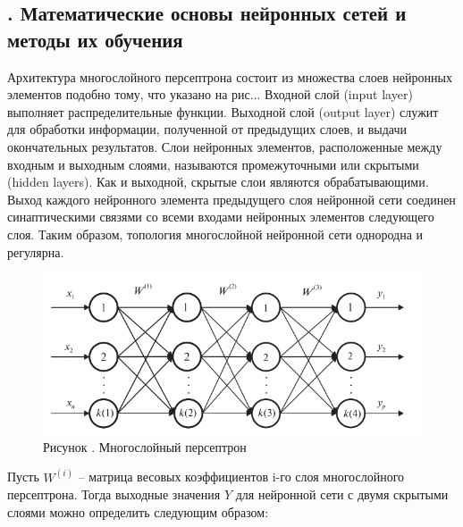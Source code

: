 \subtitlespace

\subsection*{
	\gostTitleFont
	\redline
	\thechaptercntr .\thesubchaptercntr \spc
	Математические основы нейронных сетей и методы их обучения
} \addtocounter{subchaptercntr}{1}

\subtitlespace

{\gostFont
	
	\par \redline Архитектура многослойного персептрона состоит из множества слоев нейронных элементов подобно тому, что указано на рис.\thechaptercntr .\theimagecntr. Входной слой (input layer) выполняет распределительные функции. Выходной слой (output layer) служит для обработки информации, полученной от предыдущих слоев, и выдачи окончательных результатов. Слои нейронных элементов, расположенные между входным и выходным слоями, называются промежуточными или скрытыми (hidden layers). Как и выходной, скрытые слои являются обрабатывающими. Выход каждого нейронного элемента предыдущего слоя нейронной
	сети соединен синаптическими связями со всеми входами нейронных элементов следующего слоя. Таким образом, топология многослойной нейронной сети однородна и регулярна.
	
	\begin{figure}[H]
		\centering
		\def\svgwidth{\textwidth}
		\includegraphics[scale=1.2]{images/perceptron.png}
		\caption*{\gostFont Рисунок \thechaptercntr .\theimagecntr \spc {--} Многослойный персептрон}
	\end{figure}  \addtocounter{imagecntr}{1}
	
	\par \redline Пусть $W^{(i)}$  – матрица весовых коэффициентов i-го слоя многослойного персептрона. Тогда выходные значения $Y$ для нейронной сети с двумя скрытыми слоями можно определить следующим образом:
	
}
